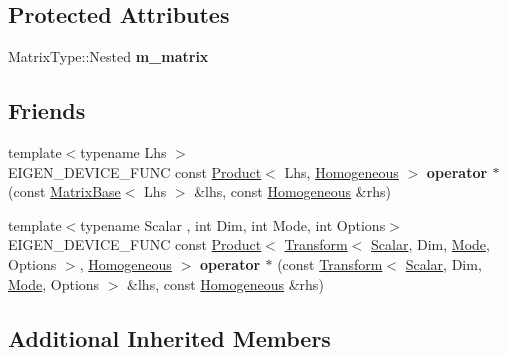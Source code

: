 \subsection*{Protected Attributes}
\begin{DoxyCompactItemize}
\item 
\mbox{\label{class_eigen_1_1_homogeneous_aa72c1376f811089b4074047fdce8b610}} 
Matrix\+Type\+::\+Nested {\bfseries m\+\_\+matrix}
\end{DoxyCompactItemize}
\subsection*{Friends}
\begin{DoxyCompactItemize}
\item 
\mbox{\label{class_eigen_1_1_homogeneous_a4429c3413389a6cb348f8f9886745e50}} 
{\footnotesize template$<$typename Lhs $>$ }\\E\+I\+G\+E\+N\+\_\+\+D\+E\+V\+I\+C\+E\+\_\+\+F\+U\+NC const \mbox{\hyperlink{class_eigen_1_1_product}{Product}}$<$ Lhs, \mbox{\hyperlink{class_eigen_1_1_homogeneous}{Homogeneous}} $>$ {\bfseries operator $\ast$} (const \mbox{\hyperlink{class_eigen_1_1_matrix_base}{Matrix\+Base}}$<$ Lhs $>$ \&lhs, const \mbox{\hyperlink{class_eigen_1_1_homogeneous}{Homogeneous}} \&rhs)
\item 
\mbox{\label{class_eigen_1_1_homogeneous_a82f5feabe7717d8ed53566f15959a04d}} 
{\footnotesize template$<$typename Scalar , int Dim, int Mode, int Options$>$ }\\E\+I\+G\+E\+N\+\_\+\+D\+E\+V\+I\+C\+E\+\_\+\+F\+U\+NC const \mbox{\hyperlink{class_eigen_1_1_product}{Product}}$<$ \mbox{\hyperlink{class_eigen_1_1_transform}{Transform}}$<$ \mbox{\hyperlink{class_eigen_1_1_dense_base_a5feed465b3a8e60c47e73ecce83e39a2}{Scalar}}, Dim, \mbox{\hyperlink{struct_mode}{Mode}}, Options $>$, \mbox{\hyperlink{class_eigen_1_1_homogeneous}{Homogeneous}} $>$ {\bfseries operator $\ast$} (const \mbox{\hyperlink{class_eigen_1_1_transform}{Transform}}$<$ \mbox{\hyperlink{class_eigen_1_1_dense_base_a5feed465b3a8e60c47e73ecce83e39a2}{Scalar}}, Dim, \mbox{\hyperlink{struct_mode}{Mode}}, Options $>$ \&lhs, const \mbox{\hyperlink{class_eigen_1_1_homogeneous}{Homogeneous}} \&rhs)
\end{DoxyCompactItemize}
\subsection*{Additional Inherited Members}


